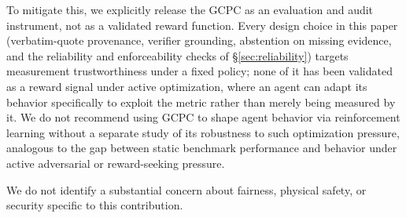 \documentclass[sigconf,nonacm]{acmart}
\begin{document}
To mitigate this, we explicitly release the GCPC as an evaluation and audit
instrument, not as a validated reward function. Every design choice in this
paper (verbatim-quote provenance, verifier grounding, abstention on missing
evidence, and the reliability and enforceability checks of
\S\ref{sec:reliability}) targets measurement trustworthiness under a fixed
policy; none of it has been validated as a reward signal under active
optimization, where an agent can adapt its behavior specifically to exploit
the metric rather than merely being measured by it. We do not recommend using
GCPC to shape agent behavior via reinforcement learning without a separate
study of its robustness to such optimization pressure, analogous to the
gap between static benchmark performance and behavior under active
adversarial or reward-seeking pressure.

We do not identify a substantial concern about fairness, physical safety, or security specific to this contribution.



\end{document}
